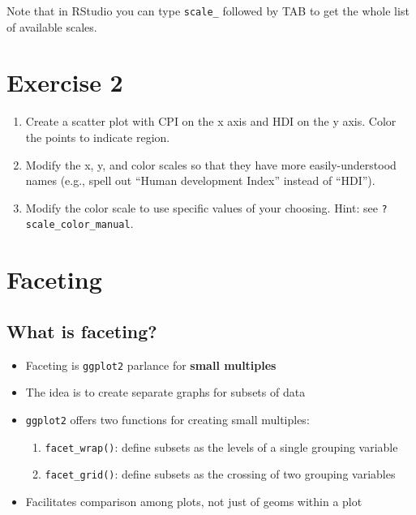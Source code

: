 \documentclass[]{book}
\providecommand{\tightlist}{%
  \setlength{\itemsep}{0pt}\setlength{\parskip}{0pt}}
\begin{document}
Note that in RStudio you can type \texttt{scale\_} followed by TAB to
get the whole list of available scales.

\section{Exercise 2}\label{exercise-2-2}

\begin{enumerate}
\def\labelenumi{\arabic{enumi}.}
\tightlist
\item
  Create a scatter plot with CPI on the x axis and HDI on the y axis.
  Color the points to indicate region.
\item
  Modify the x, y, and color scales so that they have more
  easily-understood names (e.g., spell out ``Human development Index''
  instead of ``HDI'').
\item
  Modify the color scale to use specific values of your choosing. Hint:
  see \texttt{?scale\_color\_manual}.
\end{enumerate}

\section{Faceting}\label{faceting}

\subsection{What is faceting?}\label{what-is-faceting}

\begin{itemize}
\tightlist
\item
  Faceting is \texttt{ggplot2} parlance for \textbf{small multiples}
\item
  The idea is to create separate graphs for subsets of data
\item
  \texttt{ggplot2} offers two functions for creating small multiples:

  \begin{enumerate}
  \def\labelenumi{\arabic{enumi}.}
  \tightlist
  \item
    \texttt{facet\_wrap()}: define subsets as the levels of a single
    grouping variable
  \item
    \texttt{facet\_grid()}: define subsets as the crossing of two
    grouping variables
  \end{enumerate}
\item
  Facilitates comparison among plots, not just of geoms within a plot
\end{itemize}
\end{document}
